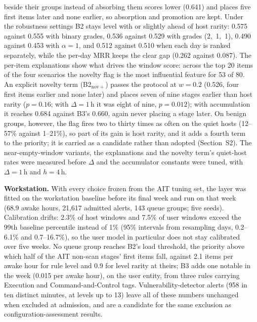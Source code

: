 \documentclass[conference]{IEEEtran}
\begin{document}
beside their groups instead of absorbing them scores lower (0.641) and places five first items later and none earlier, so absorption and promotion are kept. Under the robustness settings B2 stays level with or slightly ahead of host rarity: 0.575 against 0.555 with binary grades, 0.536 against 0.529 with grades (2,~1,~1), 0.490 against 0.453 with $\alpha = 1$, and 0.512 against 0.510 when each day is ranked separately, while the per-day MRR keeps the clear gap (0.262 against 0.087). The per-item explanations show what drives the window score: across the top 20 items of the four scenarios the novelty flag is the most influential feature for 53 of 80. An explicit novelty term (B2$_\mathrm{nov+}$) passes the protocol at $w = 0.2$ (0.526, four first items earlier and none later) and places seven of nine stages earlier than host rarity ($p = 0.16$; with $\Delta = 1$\,h it was eight of nine, $p = 0.012$); with accumulation it reaches 0.684 against B3's 0.660, again never placing a stage later. On benign groups, however, the flag fires two to thirty times as often on the quiet hosts (12--57\% against 1--21\%), so part of its gain is host rarity, and it adds a fourth term to the priority; it is carried as a candidate rather than adopted (Section~S2). The near-empty-window variants, the explanations and the novelty term's quiet-host rates were measured before $\Delta$ and the accumulator constants were tuned, with $\Delta = 1$\,h and $h = 4$\,h.

\textbf{Workstation.} With every choice frozen from the AIT tuning set, the layer was fitted on the workstation baseline before its final week and run on that week (68.9 awake hours, 21{,}617 admitted alerts, 143 queue groups; five seeds). Calibration drifts: 2.3\% of host windows and 7.5\% of user windows exceed the 99th baseline percentile instead of 1\% (95\% intervals from resampling days, 0.2--6.1\% and 0.7--16.7\%), so the user model in particular does not stay calibrated over five weeks. No queue group reaches B2's load threshold, the priority above which half of the AIT non-scan stages' first items fall, against 2.1 items per awake hour for rule level and 0.9 for level rarity at theirs; B3 adds one notable in the week (0.015 per awake hour), on the user entity, from three rules carrying Execution and Command-and-Control tags. Vulnerability-detector alerts (958 in ten distinct minutes, at levels up to 13) leave all of these numbers unchanged when excluded at admission, and are a candidate for the same exclusion as configuration-assessment results.
\end{document}
